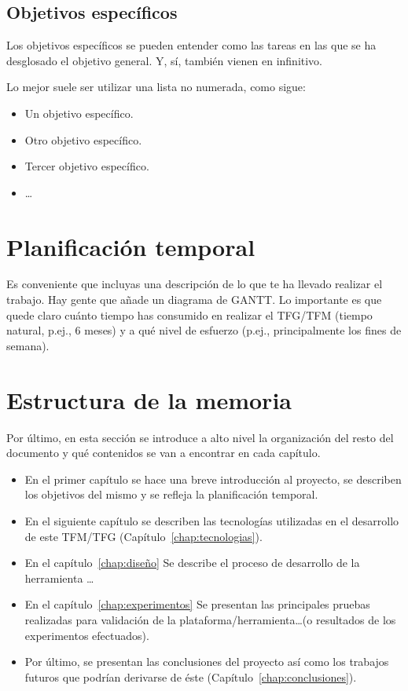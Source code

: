 \documentclass[a4paper, 12pt]{book}
\begin{document}
\subsection{Objetivos específicos}
\label{sec:objetivos-especificos}

Los objetivos específicos se pueden entender como las tareas en las que se ha desglosado el objetivo general. Y, sí, también vienen en infinitivo.

Lo mejor suele ser utilizar una lista no numerada, como sigue:

    \begin{itemize}
        \item Un objetivo específico.
        \item Otro objetivo específico.
        \item Tercer objetivo específico.
        \item \ldots
    \end{itemize}

\section{Planificación temporal}
\label{sec:planificacion-temporal}

Es conveniente que incluyas una descripción de lo que te ha llevado realizar el trabajo.
Hay gente que añade un diagrama de GANTT.
Lo importante es que quede claro cuánto tiempo has consumido en realizar el TFG/TFM 
(tiempo natural, p.ej., 6 meses) y a qué nivel de esfuerzo (p.ej., principalmente los 
fines de semana).

\section{Estructura de la memoria}
\label{sec:estructura}

Por último, en esta sección se introduce a alto nivel la organización del resto del documento
y qué contenidos se van a encontrar en cada capítulo.

    \begin{itemize}
      \item En el primer capítulo se hace una breve introducción al proyecto, se describen los objetivos del mismo y se refleja la planificación temporal.
      \item En el siguiente capítulo se describen las tecnologías utilizadas en el desarrollo de este TFM/TFG (Capítulo~\ref{chap:tecnologias}).
      \item En el capítulo~\ref{chap:diseño} Se describe el proceso de desarrollo
      de la herramienta \ldots
      \item En el capítulo~\ref{chap:experimentos} Se presentan las principales pruebas realizadas
      para validación de la plataforma/herramienta\ldots (o resultados de los experimentos
      efectuados).
      \item Por último, se presentan las conclusiones del proyecto así como los trabajos futuros que podrían derivarse de éste (Capítulo~\ref{chap:conclusiones}).
    \end{itemize}
\end{document}
